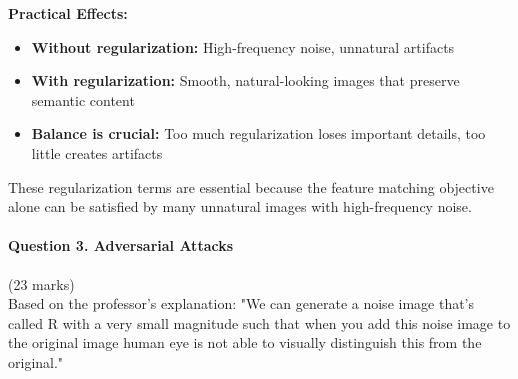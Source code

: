 \documentclass[12pt]{article}
\begin{document}
\begin{enumerate}[(a)]
{    \textbf{Practical Effects:}
    \begin{itemize}
        \item \textbf{Without regularization:} High-frequency noise, unnatural artifacts
        \item \textbf{With regularization:} Smooth, natural-looking images that preserve semantic content
        \item \textbf{Balance is crucial:} Too much regularization loses important details, too little creates artifacts
    \end{itemize}
    
    These regularization terms are essential because the feature matching objective alone can be satisfied by many unnatural images with high-frequency noise.
    }
\end{enumerate}

\newpage
\paragraph{Question 3. Adversarial Attacks}{\hfill (23 marks)}\\
Based on the professor's explanation: "We can generate a noise image that's called R with a very small magnitude such that when you add this noise image to the original image human eye is not able to visually distinguish this from the original."
\end{document}
